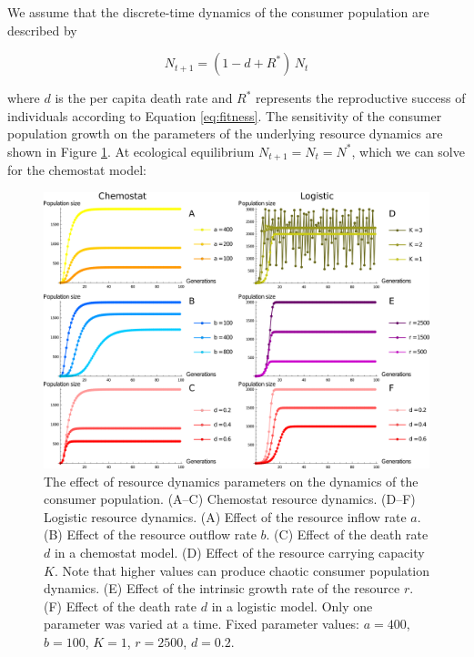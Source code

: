 We assume that the discrete-time dynamics of the consumer population are described by

\begin{equation}
    N_{t+1} = (1 - d + R^*)\,N_t
    \label{eq:recursion}
\end{equation}

where $d$ is the per capita death rate and $R^*$ represents the reproductive success of individuals according to Equation \ref{eq:fitness}. The sensitivity of the consumer population growth on the parameters of the underlying resource dynamics are shown in Figure \ref{fig:effect_of_resource_dynamics_on_population_dynamics}. At ecological equilibrium $N_{t+1} = N_t = N^*$, which we can solve for the chemostat model:

\begin{figure}
    \centering
    \includegraphics[width=\textwidth]{figures/population_dynamics_with_different_resource_dynamics.png}
    \caption{The effect of resource dynamics parameters on the dynamics of the consumer population. (A--C) Chemostat resource dynamics. (D--F) Logistic resource dynamics. (A) Effect of the resource inflow rate $a$. (B) Effect of the resource outflow rate $b$. (C) Effect of the death rate $d$ in a chemostat model. (D) Effect of the resource carrying capacity $K$. Note that higher values can produce chaotic consumer population dynamics. (E) Effect of the intrinsic growth rate of the resource $r$. (F) Effect of the death rate $d$ in a logistic model. Only one parameter was varied at a time. Fixed parameter values: $a = 400$, $b = 100$, $K = 1$, $r = 2500$, $d = 0.2$.}
    \label{fig:effect_of_resource_dynamics_on_population_dynamics}
\end{figure}

